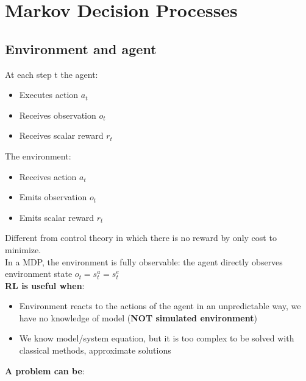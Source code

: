 
\section{Markov Decision Processes}
\subsection{Environment and agent}
    At each step t the agent:
    \begin{itemize}
        \item Executes action $a_t$
        \item Receives observation $o_t$
        \item Receives scalar reward $r_t$
    \end{itemize}
    The environment:
    \begin{itemize}
        \item Receives action $a_t$
        \item Emits observation $o_t$
        \item Emits scalar reward $r_t$
    \end{itemize}
    Different from control theory in which there is no reward by only cost to minimize.\\
    In a MDP, the environment is fully observable: the agent directly observes environment state $o_t=s_t^a=s_t^e$\\
    \textbf{RL is useful when}:
    \begin{itemize}
        \item Environment reacts to the actions of the agent in an unpredictable way, we have no knowledge of model (\textbf{NOT simulated environment})
        \item We know model/system equation, but it is too complex to be solved with classical methods, approximate solutions
    \end{itemize}
    \textbf{A problem can be}:
